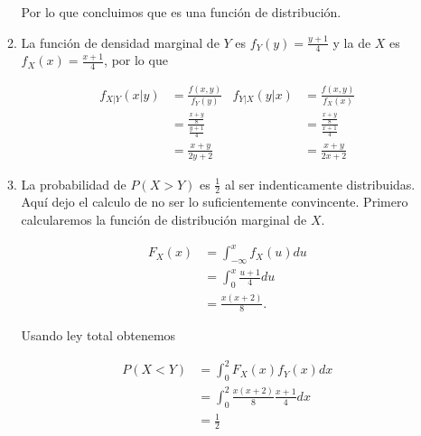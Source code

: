 \documentclass[letterpaper]{article}
\theoremstyle{definition}
\theoremstyle{lemathm}
\theoremstyle{lemademthm}
\begin{document}
\begin{enumerate}
\begin{enumerate}
			Por lo que concluimos que es una función de distribución.

			\item La función de densidad marginal de $Y$ es $f_Y(y) = \frac{y+1}{4}$ y la de $X$ es $f_X(x) = \frac{x+1}{4}$, por lo que
			
			\begin{align*}
				f_{X|Y}(x|y) &= \frac{f(x,y)}{f_Y(y)}		&f_{Y|X}(y|x) &= \frac{f(x,y)}{f_X(x)}\\
				&= \frac{\frac{x + y}{8}}{\frac{y + 1}{4}}	& &= \frac{\frac{x + y}{8}}{\frac{x + 1}{4}}\\
				&= \frac{x + y}{2y + 2}						& &= \frac{x + y}{2x + 2}
			\end{align*}

			\item La probabilidad de $P(X > Y)$ es $\frac{1}{2}$ al ser indenticamente distribuidas. Aquí dejo el calculo de no ser lo suficientemente convincente. Primero calcularemos la función de distribución marginal de $X$.
			
			\begin{align*}
				F_X(x) &= \int_{-\infty}^{x} f_X(u) du\\
				&= \int_{0}^{x} \frac{u+1}{4} du\\
				&= \frac{x(x+2)}{8}.
			\end{align*}

			Usando ley total obtenemos

			\begin{align*}
				P(X < Y) &= \int_{0}^2 F_X(x) f_Y(x) dx\\
				&= \int_{0}^2 \frac{x(x+2)}{8} \frac{x + 1}{4} dx\\
				&= \frac{1}{2}
			\end{align*}

		\end{enumerate}

    \end{enumerate}

	
\end{document}
